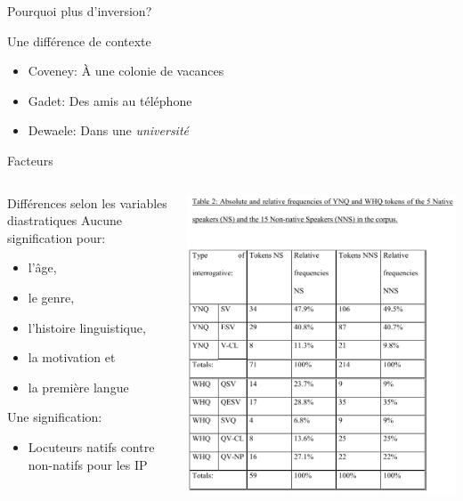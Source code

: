 \documentclass{beamer}
\begin{document}
    \begin{frame}{Pourquoi plus d'inversion?}
      \begin{block}{Une différence de contexte}
        \begin{itemize}
          \item Coveney: À une colonie de vacances
          \item Gadet: Des amis au téléphone
          \item Dewaele: Dans une \emph{université}
        \end{itemize}
      \end{block}
    \end{frame}

    \begin{frame}[t]{Facteurs}
      \begin{columns}
          \begin{block}{Différences selon les variables diastratiques}
            Aucune signification pour:
            \begin{itemize}
              \item l'âge,
              \item le genre,
              \item l'histoire linguistique,
              \item la motivation et
              \item la première langue
            \end{itemize}
            Une signification:
            \begin{itemize}
              \item Locuteurs natifs contre non-natifs pour les IP
            \end{itemize}
          \end{block}
          \includegraphics[scale=0.32]{resultats.jpg}

\end{columns}
\end{frame}
\end{document}
